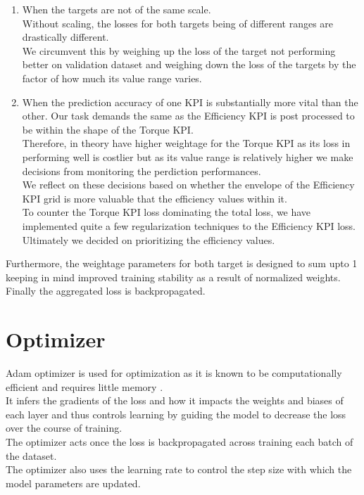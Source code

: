 \documentclass{report} %
\begin{document}
\begin{enumerate}
    \item  When the targets are not of the same scale. \\
    Without scaling, the losses for both targets being of different ranges are drastically different.\\
    We circumvent this by weighing up the loss of the target not performing better on validation dataset and weighing down the loss of the 
    targets by the factor of how much its value range varies.
    \item When the prediction accuracy of one \ac{KPI} is substantially more vital than the other. 
    Our task demands the same as the Efficiency \ac{KPI} is post processed to be within the shape of the Torque \ac{KPI}. \\
    Therefore, in theory have higher weightage for the Torque \ac{KPI} as its loss in performing well is costlier but as its value range is relatively higher we make decisions from monitoring the perdiction performances.\\
    We reflect on these decisions based on whether the envelope of the Efficiency \ac{KPI} grid is more valuable that the efficiency values within it.\\
    To counter the Torque \ac{KPI} loss dominating the total loss, we have implemented quite a few regularization techniques to the Efficiency \ac{KPI} loss.\\
    Ultimately we decided on prioritizing the efficiency values.
\end{enumerate}
Furthermore, the weightage parameters for both target is designed to sum upto 1 keeping in mind improved training stability as a result of normalized weights. \\

Finally the aggregated loss is backpropagated.\\
\vspace{0.2cm} %

\section{Optimizer}\label{sec:Optimizer}

Adam optimizer is used for optimization as it is known to be computationally efficient and requires little memory \cite{ADAM-2017}. \\
It infers the gradients of the loss and how it impacts the weights and biases of each layer and thus controls learning by guiding the model to decrease the loss over the course of training. \\
The optimizer acts once the loss is backpropagated across training each batch of the dataset.\\
The optimizer also uses the learning rate to control the step size with which the model parameters are updated.\\
\end{document}
